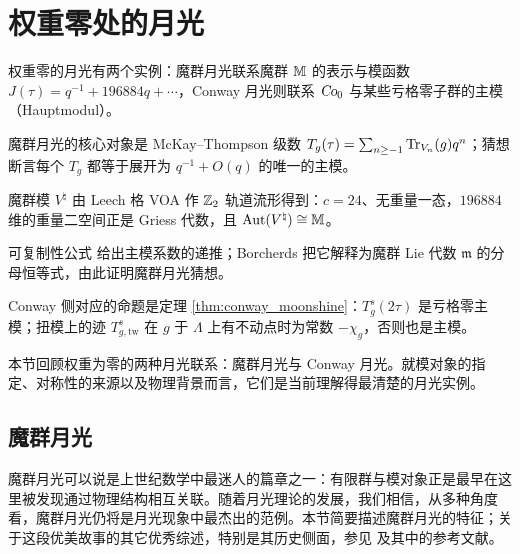 \section{权重零处的月光}
\label{cha:weight0}

\begin{keytakeaways}
  \item 权重零的月光有两个实例：魔群月光联系魔群 $\mathbb{M}$ 的表示与模函数 $J(\tau)=q^{-1}+196884q+\cdots$，Conway 月光则联系 $\operatorname{\textsl{Co}}_0$ 与某些亏格零子群的主模（Hauptmodul）。
  \item 魔群月光的核心对象是 McKay–Thompson 级数 $T_g(\tau)=\sum_{n\geq-1}\operatorname{Tr}_{V_n}(g)q^n$；猜想断言每个 $T_g$ 都等于展开为 $q^{-1}+O(q)$ 的唯一的主模。
  \item 魔群模 $V^\natural$ 由 Leech 格 VOA 作 $\mathbb{Z}_2$ 轨道流形得到：$c=24$、无重量一态，$196884$ 维的重量二空间正是 Griess 代数，且 $\operatorname{\text{Aut}}(V^\natural)\cong\mathbb{M}$。
  \item 可复制性公式  给出主模系数的递推；Borcherds 把它解释为魔群 Lie 代数 $\mathfrak{m}$ 的分母恒等式，由此证明魔群月光猜想。
  \item Conway 侧对应的命题是定理 \ref{thm:conway_moonshine}：$T^s_g(2\tau)$ 是亏格零主模；扭模上的迹 $T^s_{g,\text{tw}}$ 在 $g$ 于 $\Lambda$ 上有不动点时为常数 $-\chi_g$，否则也是主模。
\end{keytakeaways}

本节回顾权重为零的两种月光联系：魔群月光与 Conway 月光。就模对象的指定、对称性的来源以及物理背景而言，它们是当前理解得最清楚的月光实例。


\subsection{魔群月光}
\label{sec:mm}

魔群月光可以说是上世纪数学中最迷人的篇章之一：有限群与模对象正是最早在这里被发现通过物理结构相互关联。随着月光理论的发展，我们相信，从多种角度看，魔群月光仍将是月光现象中最杰出的范例。本节简要描述魔群月光的特征；关于这段优美故事的其它优秀综述，特别是其历史侧面，参见 \cite{MR2201600,mason2014vertex,MR3375653} 及其中的参考文献。

